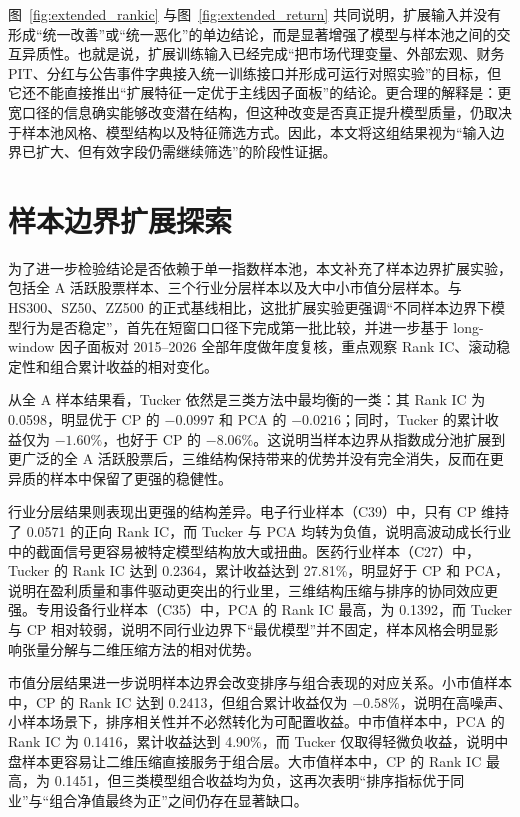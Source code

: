 图~\ref{fig:extended_rankic} 与图~\ref{fig:extended_return} 共同说明，扩展输入并没有形成“统一改善”或“统一恶化”的单边结论，而是显著增强了模型与样本池之间的交互异质性。也就是说，扩展训练输入已经完成“把市场代理变量、外部宏观、财务 PIT、分红与公告事件字典接入统一训练接口并形成可运行对照实验”的目标，但它还不能直接推出“扩展特征一定优于主线因子面板”的结论。更合理的解释是：更宽口径的信息确实能够改变潜在结构，但这种改变是否真正提升模型质量，仍取决于样本池风格、模型结构以及特征筛选方式。因此，本文将这组结果视为“输入边界已扩大、但有效字段仍需继续筛选”的阶段性证据。

\section{样本边界扩展探索}

为了进一步检验结论是否依赖于单一指数样本池，本文补充了样本边界扩展实验，包括全 A 活跃股票样本、三个行业分层样本以及大中小市值分层样本。与 HS300、SZ50、ZZ500 的正式基线相比，这批扩展实验更强调“不同样本边界下模型行为是否稳定”，首先在短窗口口径下完成第一批比较，并进一步基于 long-window 因子面板对 2015--2026 全部年度做年度复核，重点观察 Rank IC、滚动稳定性和组合累计收益的相对变化。

从全 A 样本结果看，Tucker 依然是三类方法中最均衡的一类：其 Rank IC 为 0.0598，明显优于 CP 的 $-0.0997$ 和 PCA 的 $-0.0216$；同时，Tucker 的累计收益仅为 $-1.60\%$，也好于 CP 的 $-8.06\%$。这说明当样本边界从指数成分池扩展到更广泛的全 A 活跃股票后，三维结构保持带来的优势并没有完全消失，反而在更异质的样本中保留了更强的稳健性。

行业分层结果则表现出更强的结构差异。电子行业样本（C39）中，只有 CP 维持了 0.0571 的正向 Rank IC，而 Tucker 与 PCA 均转为负值，说明高波动成长行业中的截面信号更容易被特定模型结构放大或扭曲。医药行业样本（C27）中，Tucker 的 Rank IC 达到 0.2364，累计收益达到 27.81\%，明显好于 CP 和 PCA，说明在盈利质量和事件驱动更突出的行业里，三维结构压缩与排序的协同效应更强。专用设备行业样本（C35）中，PCA 的 Rank IC 最高，为 0.1392，而 Tucker 与 CP 相对较弱，说明不同行业边界下“最优模型”并不固定，样本风格会明显影响张量分解与二维压缩方法的相对优势。

市值分层结果进一步说明样本边界会改变排序与组合表现的对应关系。小市值样本中，CP 的 Rank IC 达到 0.2413，但组合累计收益仅为 $-0.58\%$，说明在高噪声、小样本场景下，排序相关性并不必然转化为可配置收益。中市值样本中，PCA 的 Rank IC 为 0.1416，累计收益达到 4.90\%，而 Tucker 仅取得轻微负收益，说明中盘样本更容易让二维压缩直接服务于组合层。大市值样本中，CP 的 Rank IC 最高，为 0.1451，但三类模型组合收益均为负，这再次表明“排序指标优于同业”与“组合净值最终为正”之间仍存在显著缺口。

